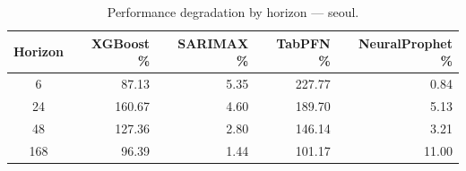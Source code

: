 \begin{table}[h]
\centering
\caption{Performance degradation by horizon — seoul.}
\label{tab:degradation_horizon_seoul}
\begin{tabular}{crrrr}
\toprule
Horizon & XGBoost \% & SARIMAX \% & TabPFN \% & NeuralProphet \% \\
\midrule
6 & 87.13 & 5.35 & 227.77 & 0.84 \\
24 & 160.67 & 4.60 & 189.70 & 5.13 \\
48 & 127.36 & 2.80 & 146.14 & 3.21 \\
168 & 96.39 & 1.44 & 101.17 & 11.00 \\
\bottomrule
\end{tabular}
\end{table}
